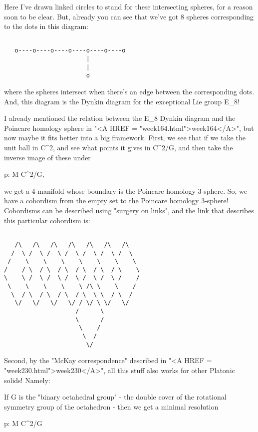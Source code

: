 Here I've drawn linked circles to stand for these intersecting 
spheres, for a reason soon to be clear.  But, already you can 
see that we've got 8 spheres corresponding to the dots in this
diagram:



\begin{verbatim}

   o----o----o----o----o----o----o
                       |
                       |
                       o
\end{verbatim}
    
where the spheres intersect when there's an edge between the
corresponding dots.  And, this diagram is the Dynkin diagram for 
the exceptional Lie group E_{8}! 

I already mentioned the relation between the E_{8} Dynkin
diagram and the Poincare homology sphere in "<A HREF =
"week164.html">week164</A>", but now maybe it fits better into a
big framework.  First, we see that if we take the unit ball in
C^{2}, and see what points it gives in C^{2}/G, and
then take the inverse image of these under

p: M \to  C^{2}/G, 

we get a 4-manifold whose boundary is the Poincare homology 
3-sphere.  So, we have a cobordism from the empty set to the 
Poincare homology 3-sphere!  Cobordisms can be described using
"surgery on links", and the link that describes this particular
cobordism is:


\begin{verbatim}

   /\   /\   /\   /\   /\   /\   /\ 
  /  \ /  \ /  \ /  \ /  \ /  \ /  \
 /    \    \    \    \    \    \    \
/    / \  / \  / \  / \  / \  / \    \ 
\    \ /  \ /  \ /  \ /  \ /  \ /    / 
 \    \    \    \    \ /\ \    \    /
  \  / \  / \  / \  / \  \ \  / \  /
   \/   \/   \/   \/ / \/ \ \/   \/
                    /      \ 
                    \      /
                     \    /
                      \  /
                       \/ 
\end{verbatim}
    

Second, by the "McKay correspondence" described in "<A
HREF = "week230.html">week230</A>", all this stuff also works for
other Platonic solids!  Namely:

If G is the "binary octahedral group" - the double cover of the 
rotational symmetry group of the octahedron - then we get a minimal 
resolution

p: M \to  C^{2}/G

